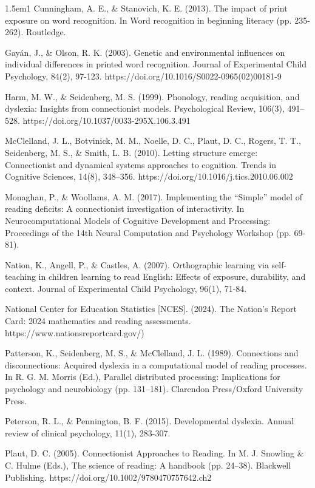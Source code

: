 \documentclass[
  ,man,floatsintext]{apa6}
\begin{document}
\begin{hangparas}{1.5em}{1}
Cunningham, A. E., \& Stanovich, K. E. (2013). The impact of print exposure on word recognition. In Word recognition in beginning literacy (pp. 235-262). Routledge.

Gayán, J., \& Olson, R. K. (2003). Genetic and environmental influences on individual differences in printed word recognition. Journal of Experimental Child Psychology, 84(2), 97-123. https://doi.org/10.1016/S0022-0965(02)00181-9

Harm, M. W., \& Seidenberg, M. S. (1999). Phonology, reading acquisition, and dyslexia: Insights from connectionist models. Psychological Review, 106(3), 491–528. https://doi.org/10.1037/0033-295X.106.3.491

McClelland, J. L., Botvinick, M. M., Noelle, D. C., Plaut, D. C., Rogers, T. T., Seidenberg, M. S., \& Smith, L. B. (2010). Letting structure emerge: Connectionist and dynamical systems approaches to cognition. Trends in Cognitive Sciences, 14(8), 348–356. https://doi.org/10.1016/j.tics.2010.06.002

Monaghan, P., \& Woollams, A. M. (2017). Implementing the “Simple” model of reading deficits: A connectionist investigation of interactivity. In Neurocomputational Models of Cognitive Development and Processing: Proceedings of the 14th Neural Computation and Psychology Workshop (pp. 69-81).

Nation, K., Angell, P., \& Castles, A. (2007). Orthographic learning via self-teaching in children learning to read English: Effects of exposure, durability, and context. Journal of Experimental Child Psychology, 96(1), 71-84.

National Center for Education Statistics [NCES]. (2024). The Nation's Report Card: 2024 mathematics and reading assessments. https://www.nationsreportcard.gov/)

Patterson, K., Seidenberg, M. S., \& McClelland, J. L. (1989). Connections and disconnections: Acquired dyslexia in a computational model of reading processes. In R. G. M. Morris (Ed.), Parallel distributed processing: Implications for psychology and neurobiology (pp. 131–181). Clarendon Press/Oxford University Press. 

Peterson, R. L., \& Pennington, B. F. (2015). Developmental dyslexia. Annual review of clinical psychology, 11(1), 283-307.

Plaut, D. C. (2005). Connectionist Approaches to Reading. In M. J. Snowling \& C. Hulme (Eds.), The science of reading: A handbook (pp. 24–38). Blackwell Publishing. https://doi.org/10.1002/9780470757642.ch2


\end{hangparas}
\end{document}
